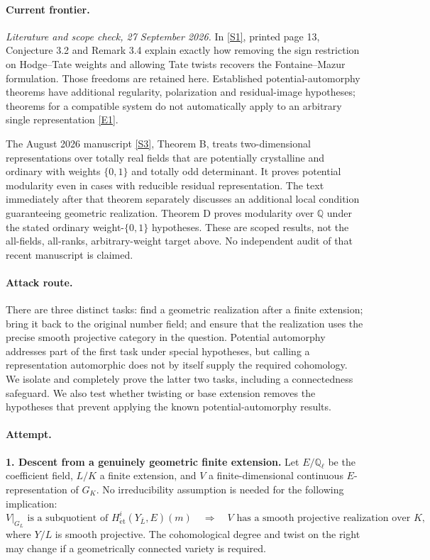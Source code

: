 \documentclass[11pt,a4paper]{article}
\newcommand{\Q}{\mathbb{Q}}
\newcommand{\sref}[2]{\hyperlink{source:#1:#2}{[S#2]}}
\newcommand{\eref}[2]{\hyperlink{extra:#1:#2}{[E#2]}}
\numberwithin{equation}{section}
\begin{document}
\paragraph{Current frontier.}
\textit{Literature and scope check, 27 September 2026.}
In \sref{statement}{1}, printed page 13, Conjecture 3.2 and Remark 3.4 explain
exactly how removing the sign restriction on Hodge--Tate weights and allowing
Tate twists recovers the Fontaine--Mazur formulation. Those freedoms are
retained here. Established potential-automorphy theorems have additional
regularity, polarization and residual-image hypotheses; theorems for a
compatible system do not automatically apply to an arbitrary single
representation \eref{statement}{1}.

The August 2026 manuscript \sref{statement}{3}, Theorem B, treats two-dimensional
representations over totally real fields that are potentially crystalline
and ordinary with weights $\{0,1\}$ and totally odd determinant. It proves
potential modularity even in cases with reducible residual representation.
The text immediately after that theorem separately discusses an additional
local condition guaranteeing geometric realization. Theorem D proves
modularity over $\Q$ under the stated ordinary weight-$\{0,1\}$ hypotheses.
These are scoped results, not the all-fields, all-ranks, arbitrary-weight
target above. No independent audit of that recent manuscript is claimed.

\paragraph{Attack route.}
There are three distinct tasks: find a geometric realization after a finite
extension; bring it back to the original number field; and ensure that the
realization uses the precise smooth projective category in the question.
Potential automorphy addresses part of the first task under special
hypotheses, but calling a representation automorphic does not by itself
supply the required cohomology. We isolate and completely prove the latter
two tasks, including a connectedness safeguard. We also test whether twisting
or base extension removes the hypotheses that prevent applying the known
potential-automorphy results.

\paragraph{Attempt.}
\textbf{1. Descent from a genuinely geometric finite extension.}
Let $E/\Q_\ell$ be the coefficient field, $L/K$ a finite extension, and
$V$ a finite-dimensional continuous $E$-representation of $G_K$. No
irreducibility assumption is needed for the following implication:
\begin{equation}\label{eq:statement:potential}
 \left.V\right|_{G_L}\text{ is a subquotient of }
 H^i_{\mathrm{\acute et}}(Y_{\bar L},E)(m)
 \quad\Longrightarrow\quad
 V\text{ has a smooth projective realization over }K,
\end{equation}
where $Y/L$ is smooth projective. The cohomological degree and twist on the
right may change if a geometrically connected variety is required.
\end{document}
